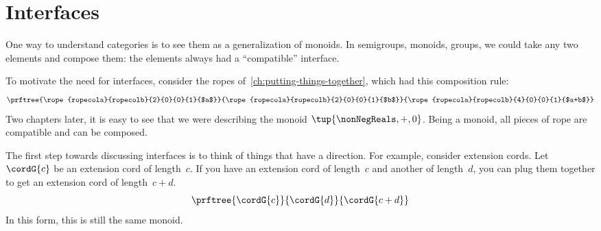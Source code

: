 

\section{Interfaces}\label{sec:interfaces}

One way to understand categories is to see them as a generalization of monoids.
In semigroups, monoids, groups, we could take any two elements and compose them: the elements always had a ``compatible'' interface.

To motivate the need for interfaces, consider the ropes of~\cref{ch:putting-things-together}, which had this composition rule:
%
\begin{equation*}
    \prftree{\rope{ropecola}{ropecolb}{2}{0}{0}{1}{$a$}}
    {\rope{ropecola}{ropecolb}{2}{0}{0}{1}{$b$}}
    {\rope{ropecola}{ropecolb}{4}{0}{0}{1}{$a+b$}}
\end{equation*}
%
Two chapters later, it is easy to see that we were describing the monoid $\tup{\nonNegReals, +, 0}$.
Being a monoid, all pieces of rope are compatible and can be composed.

The first step towards discussing interfaces is to think of things that have a direction.
For example, consider extension cords.
Let~$\cordG{c}$ be an extension cord of length~$c$.
If you have an extension cord of length~$c$ and another of length~$d$, you can plug them together to get an extension cord of length~$c+d$.
%
\begin{equation}
    \label{eq:cords}
    \prftree{\cordG{c}}{\cordG{d}}{\cordG{c+d}}
\end{equation}
%
In this form, this is still the same monoid.

